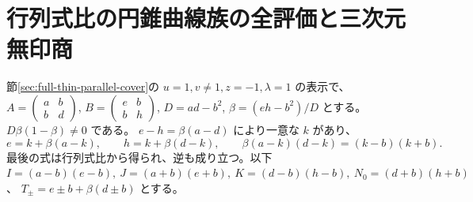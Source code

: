 \section{行列式比の円錐曲線族の全評価と三次元無印商}
\label{sec:unequal-determinant-conic}
節\ref{sec:full-thin-parallel-cover}の $u=1,v\ne1,z=-1,\lambda=1$ の表示で、
$A=\left(\begin{smallmatrix}a&b\\b&d\end{smallmatrix}\right)$,
$B=\left(\begin{smallmatrix}e&b\\b&h\end{smallmatrix}\right)$,
$D=ad-b^2$, $\beta=(eh-b^2)/D$ とする。$D\beta(1-\beta)\ne0$ である。
$e-h=\beta(a-d)$ により一意な $k$ があり、
\[
 e=k+\beta(a-k),\qquad h=k+\beta(d-k),\qquad
 \beta(a-k)(d-k)=(k-b)(k+b).
\]
最後の式は行列式比から得られ、逆も成り立つ。以下
$I=(a-b)(e-b),\ J=(a+b)(e+b),\ K=(d-b)(h-b),\ N_0=(d+b)(h+b)$、
$T_\pm=e\pm b+\beta(d\pm b)$ とする。

